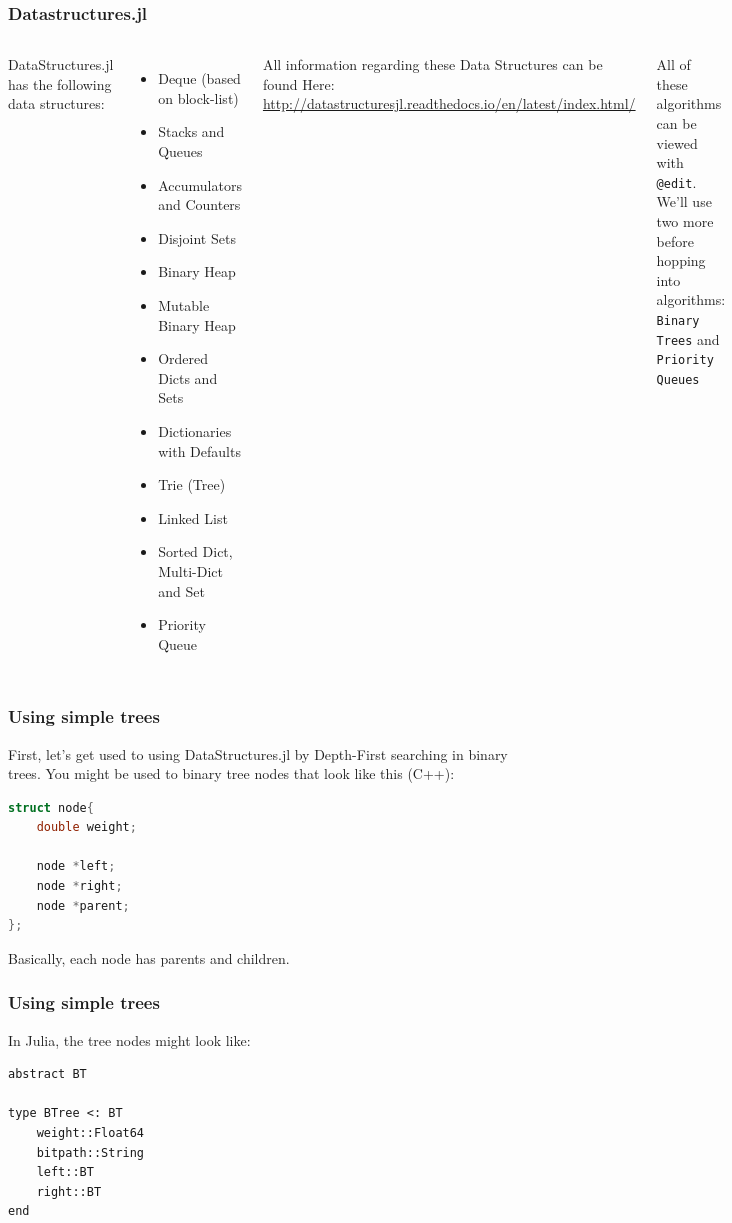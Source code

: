 \documentclass{beamer}
\begin{document}
\begin{frame}
\frametitle{Datastructures.jl}

\begin{columns}
DataStructures.jl has the following data structures:
\begin{itemize}
\item Deque (based on block-list)
\item Stacks and Queues
\item Accumulators and Counters
\item Disjoint Sets
\item Binary Heap
\item Mutable Binary Heap
\item Ordered Dicts and Sets
\item Dictionaries with Defaults
\item Trie (Tree)
\item Linked List
\item Sorted Dict, Multi-Dict and Set
\item Priority Queue
\end{itemize}
\pause
{}
All information regarding these Data Structures can be found Here: \url{ http://datastructuresjl.readthedocs.io/en/latest/index.html/}

\vspace{0.5cm}
All of these algorithms can be viewed with \texttt{@edit}. We'll use two more before hopping into algorithms: \texttt{Binary Trees} and \texttt{Priority Queues}
\end{columns}

\end{frame}


\begin{frame}[fragile]
\frametitle{Using simple trees}
First, let's get used to using DataStructures.jl by Depth-First searching in binary trees. You might be used to binary 	tree nodes that look like this (C++):
\begin{lstlisting}[language=c++]
struct node{
    double weight;

    node *left;
    node *right;
    node *parent;
};
\end{lstlisting}

Basically, each node has parents and children.
\end{frame}

\begin{frame}[fragile]
\frametitle{Using simple trees}
In Julia, the tree nodes might look like:
\begin{lstlisting}
abstract BT 

type BTree <: BT
    weight::Float64
    bitpath::String
    left::BT
    right::BT
end

\end{lstlisting}
\end{frame}
\end{document}
